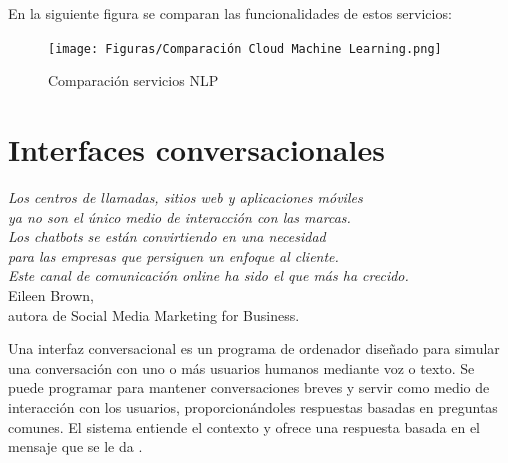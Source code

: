 \newpage

En la siguiente figura se comparan las funcionalidades de estos servicios:
\vspace{-10mm}
\begin{figure}[ht]
	\begin{center}
		\texttt{[image: Figuras/Comparación Cloud Machine Learning.png]}
	\end{center}
	\caption{\label{fig:NLPComparative} Comparación servicios NLP}
\end{figure}



\section{Interfaces conversacionales}

\begin{flushright}
\begin{minipage}[b][4cm][t]{11cm}
\begin{flushright}
{\small \emph{Los centros de llamadas, sitios web y aplicaciones móviles}} \vspace{-1pt} \\
{\small \emph{ya no son el único medio de interacción con las marcas.}} \vspace{-1pt} \\
{\small \emph{Los chatbots se están convirtiendo en una necesidad }} \vspace{-1pt}\\
{\small \emph{para las empresas que persiguen un enfoque al cliente. }} \vspace{-1pt}\\
{\small \emph{Este canal de comunicación online ha sido el que más ha crecido.}} \vspace{1mm}\\
{\footnotesize Eileen Brown,} \vspace{-1.5pt} \\
{\footnotesize autora de Social Media Marketing for Business.\phantom{l}}
\end{flushright}
\end{minipage}
\end{flushright}


Una interfaz conversacional es un programa de ordenador diseñado para simular una conversación con uno o más usuarios humanos mediante voz o texto. Se puede programar para mantener conversaciones breves y servir como medio de interacción con los usuarios, proporcionándoles respuestas basadas en preguntas comunes. El sistema entiende el contexto y ofrece una respuesta basada en el mensaje que se le da \cite{Gupta2015AnEW}. 

